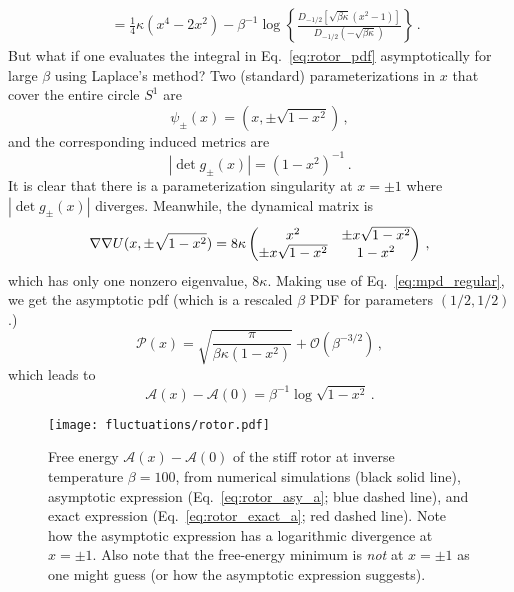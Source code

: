 \begin{subappendices}
\begin{equation}
\begin{aligned}
                                                      &= \tfrac{1}{4}\kappa(x^4 - 2x^2) - \beta^{-1}\log\left\{\frac{D_{-1/2}\left[\sqrt{\beta\kappa}(x^2-1)\right]}{D_{-1/2}\left(-\sqrt{\beta\kappa}\right)}\right\}\,.
\end{aligned}
\end{equation}
But what if one evaluates the integral in Eq.~\eqref{eq:rotor_pdf} asymptotically for large $\beta$ using Laplace's method?
Two (standard) parameterizations in $x$ that cover the entire circle $S^1$ are
\begin{equation}
  \psi_{\pm}(x) = (x, \pm\sqrt{1 - x^2})\,,
\end{equation}
and the corresponding induced metrics are
\begin{equation}
  |\det g_{\pm}(x)| = (1-x^2)^{-1}\,.
\end{equation}
It is clear that there is a parameterization singularity at $x = \pm 1$ where $|\det g_{\pm}(x)|$ diverges.
Meanwhile, the dynamical matrix is
\begin{equation}
  \nabla\nabla U(x, \pm\sqrt{1-x^2}) = 8\kappa
  \begin{pmatrix}
    x^2 & \pm x\sqrt{1-x^2}\\
    \pm x\sqrt{1-x^2} & 1-x^2
  \end{pmatrix}\,,
\end{equation}
which has only one nonzero eigenvalue, $8\kappa$.
Making use of Eq.~\eqref{eq:mpd_regular}, we get the asymptotic \ac{pdf} (which is a rescaled $\beta$ PDF for parameters $(1/2, 1/2)$.)
\begin{equation}
  \mathscr{P}(x) = \sqrt{\frac{\pi}{\beta\kappa(1-x^2)}} + \mathcal{O}(\beta^{-3/2})\,,
\end{equation}
which leads to
\begin{equation}\label{eq:rotor_asy_a}
  \mathscr{A}(x) - \mathscr{A}(0) = \beta^{-1}\log\sqrt{1-x^2}\,.
\end{equation}
\begin{figure}
  \begin{center}
    \texttt{[image: fluctuations/rotor.pdf]}
  \end{center}
  \caption{
    Free energy $\mathscr{A}(x) - \mathscr{A}(0)$ of the stiff rotor at inverse temperature $\beta = 100$, from numerical simulations (black solid line), asymptotic expression (Eq.~\ref{eq:rotor_asy_a}; blue dashed line), and exact expression (Eq.~\ref{eq:rotor_exact_a}; red dashed line).
    Note how the asymptotic expression has a logarithmic divergence at $x = \pm 1$.
    Also note that the free-energy minimum is \emph{not} at $x = \pm 1$ as one might guess (or how the asymptotic expression suggests).
  }
  \label{fig:rotor}
\end{figure}


\end{subappendices}
